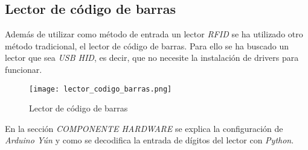 \subsection{Lector de código de barras}

Además de utilizar como método de entrada un lector \emph{RFID} se ha utilizado otro método tradicional, el lector de código de barras. Para ello se ha buscado un lector que sea \emph{USB HID}, es decir, que no necesite la instalación de drivers para funcionar.

\begin{figure}[H]
    \centering
    \texttt{[image: lector\_codigo\_barras.png]}
    \caption{Lector de código de barras}\label{fig:lector_codigo_barras}
\end{figure}

En la sección \emph{COMPONENTE HARDWARE} se explica la configuración de \emph{Arduino Yún} y como se decodifica la entrada de dígitos del lector con \emph{Python}.